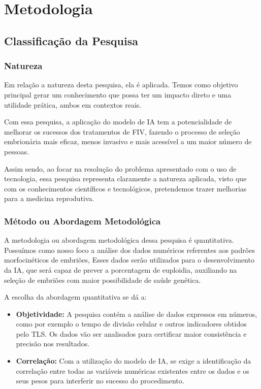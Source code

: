 \chapter[Metodologia]{Metodologia}

\section{Classificação da Pesquisa}

\subsection{Natureza}

Em relação a natureza desta pesquisa, ela é aplicada. Temos como objetivo principal gerar um conhecimento que possa ter um impacto direto e uma utilidade prática, ambos em contextos reais. 

Com essa pesquisa, a aplicação do modelo de IA tem a potencialidade de melhorar os sucessos dos tratamentos de FIV, fazendo o processo de seleção embrionária mais eficaz, menos invasivo e mais acessível a um maior número de pessoas.

Assim sendo, ao focar na resolução do problema apresentado com o uso de tecnologia, essa pesquisa representa claramente a natureza aplicada, visto que com os conhecimentos científicos e tecnológicos, pretendemos trazer melhorias para a medicina reprodutiva. 

\subsection{Método ou Abordagem Metodológica}

A metodologia ou abordagem metodológica dessa pesquisa é quantitativa. Possuímos como nosso foco a análise dos dados numéricos referentes aos padrões morfocinéticos de embriões, Esses dados serão utilizados para o desenvolvimento da IA, que será capaz de prever a porcentagem de euploidia, auxiliando na seleção de embriões com maior possibilidade de saúde genética.

A escolha da abordagem quantitativa se dá a: 

\begin{itemize}
  \item \textbf{Objetividade:} A pesquisa contém a análise de dados expressos em números, como por exemplo o tempo de divisão celular e outros indicadores obtidos pelo TLS. Os dados vão ser analisados para certificar maior consistência e precisão nos resultados.
  \item \textbf{Correlação:} Com a utilização do modelo de IA, se exige a identificação da correlação entre todas as variáveis numéricas existentes entre os dados e os seus pesos para interferir no sucesso do procedimento. 
\end{itemize}

